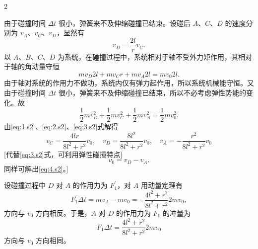 \begin{solution}{2}
\begin{subsolution}
由于碰撞时间 $\Delta t$ 很小，弹簧来不及伸缩碰撞已结束。设碰后 $A$、$C$、$D$ 的速度分别为 $v_{A}$、$v_{C}$、$v_{D}$，显然有
\begin{equation}
v_{D} = \frac{2l}{r} v_{C}.
\label{eq:1.s2}
\end{equation}
以 $A$、$B$、$C$、$D$ 为系统，在碰撞过程中，系统相对于轴不受外力矩作用，其相对于轴的角动量守恒
\begin{equation}
m v_{D} 2l + m v_{C} r + m v_{A} 2l = m v_{0} 2l.
\label{eq:2.s2}
\end{equation}
由于轴对系统的作用力不做功，系统内仅有弹力起作用，所以系统机械能守恒。又由于碰撞时间 $\Delta t$ 很小，弹簧来不及伸缩碰撞已结束，所以不必考虑弹性势能的变化。故
\begin{equation}
\frac{1}{2} m v_{D}^{2} + \frac{1}{2} m v_{C}^{2} + \frac{1}{2} m v_{A}^{2} = \frac{1}{2} m v_{0}^{2}.
\label{eq:3.s2}
\end{equation}
由\eqref{eq:1.s2}、\eqref{eq:2.s2}、\eqref{eq:3.s2}式解得
\begin{equation}
v_{C} = \frac{4lr}{8l^{2}+r^{2}} v_{0}, \quad v_{D} = \frac{8l^{2}}{8l^{2}+r^{2}} v_{0}, \quad v_{A} = -\frac{r^{2}}{8l^{2}+r^{2}} v_{0}
\label{eq:4.s2}
\end{equation}
[代替\eqref{eq:3.s2}式，可利用弹性碰撞特点]
\begin{equation*}
v_{0} = v_{D} - v_{A}.
\end{equation*}
同样可解出\eqref{eq:4.s2}。]

设碰撞过程中 $D$ 对 $A$ 的作用力为 $F_{1}^{\prime}$，对 $A$ 用动量定理有
\begin{equation}
F_{1}^{\prime} \Delta t = m v_{A} - m v_{0} = -\frac{4l^{2}+r^{2}}{8l^{2}+r^{2}} 2m v_{0},
\label{eq:5.s2}
\end{equation}
方向与 $v_{0}$ 方向相反。于是，$A$ 对 $D$ 的作用力为 $F_{1}$ 的冲量为
\begin{equation}
F_{1} \Delta t = \frac{4l^{2}+r^{2}}{8l^{2}+r^{2}} 2m v_{0}
\label{eq:6.s2}
\end{equation}
方向与 $v_{0}$ 方向相同。


\end{subsolution}
\end{solution}
